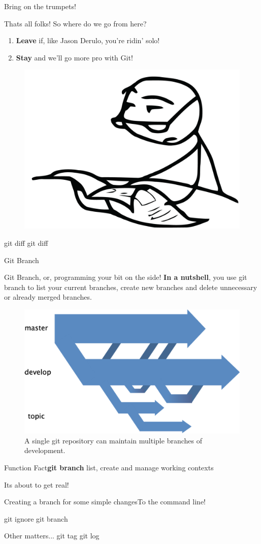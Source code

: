 \documentclass{beamer}
\newcommand{\demo}[1]{\begin{frame}{Its about to get real!}\begin{exampleblock}{#1}To the command line!\end{exampleblock}\end{frame}}
\newcommand{\clfact}[2]{\begin{alertblock}{Function Fact}\textbf{#1} #2\end{alertblock}}
\begin{document}
\begin{frame}{Bring on the trumpets!}
    \begin{block}{Thats all folks!}
        So where do we go from here?
        \begin{enumerate}
            \item \textbf{Leave} if, like Jason Derulo, you're ridin' solo!
            \item \textbf{Stay} and we'll go more pro with Git!
        \end{enumerate}
    \end{block}
    \begin{figure}[ht]
        \centering
        \includegraphics[width=0.8\linewidth]{img/pleasestay.png}
    \end{figure}
\end{frame}

\begin{frame}{git diff}
    git diff
\end{frame}

\begin{frame}{Git Branch}
    \begin{block}{Git Branch, or, programming your bit on the side!}
    \textbf{In a nutshell}, you use git branch to list your current branches, create new branches and delete unnecessary or already merged branches. 
    \begin{figure}[ht]
        \centering
        \includegraphics[width=0.40\linewidth]{img/branching.png}
        \caption{A single git repository can maintain multiple branches of development.}
    \end{figure}
    \end{block}
    \clfact{git branch}{list, create and manage working contexts}
\end{frame}
\demo{Creating a branch for some simple changes}

\begin{frame}{git ignore}
    git branch
\end{frame}

\begin{frame}{Other matters...}
    git tag
    git log
\end{frame}
\end{document}
